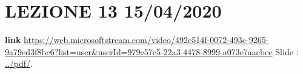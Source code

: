 \section*{LEZIONE 13 15/04/2020}
\textbf{link} \url{https://web.microsoftstream.com/video/492e514f-0072-493c-9265-9a79ed3f8bc6?list=user&userId=979e57e5-22a3-4478-8999-a073e7aacbee}\newline
\newline
Slide : \url{../pdf/}.